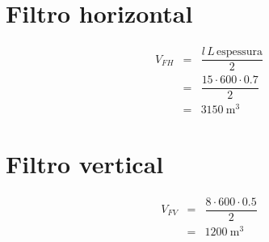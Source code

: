 \documentclass[a4paper, 12pt, brazilian]{article}
\begin{document}
	\section{Filtro horizontal}
	
	\begin{eqnarray}
		V_{FH}&=&\dfrac{l\,L\,\textrm{espessura}}{2}\\
		&=&\dfrac{15\cdot 600\cdot 0.7}{2}\\
		&=&\SI{3150}{\meter^{3}}
	\end{eqnarray}
	
	\section{Filtro vertical}
	
	\begin{eqnarray}
		V_{FV}&=&\dfrac{8\cdot 600\cdot 0.5}{2}\\
		&=&\SI{1200}{\meter^{3}}
	\end{eqnarray}
	
\end{document}
